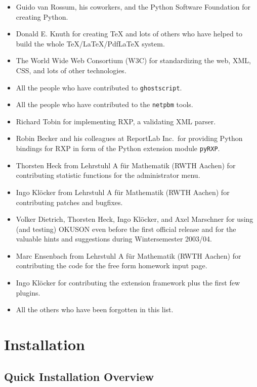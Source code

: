 \documentclass[12pt,openany,a4paper]{book}
\newcommand{\OKUSON}{\textsf{OKUSON}}
\begin{document}
\begin{itemize}
\item Guido van Rossum, his coworkers, and the Python Software Foundation
for creating Python.
\item Donald E. Knuth for creating {\TeX} and lots of others who have 
helped to build the whole {\TeX/\LaTeX/Pdf\LaTeX} system.
\item The World Wide Web Consortium (W3C) for standardizing the web,
XML, CSS, and lots of other technologies.
\item All the people who have contributed to \texttt{ghostscript}.
\item All the people who have contributed to the \texttt{netpbm} tools.
\item Richard Tobin for implementing \textsf{RXP}, a validating XML parser.
\item Robin Becker and his colleagues at ReportLab Inc.~for providing
Python bindings for \textsf{RXP} in form of the Python extension module
\texttt{pyRXP}.
\item Thorsten Heck from Lehrstuhl A für Mathematik (RWTH Aachen) for
contributing statistic functions for the administrator menu.
\item Ingo Klöcker from Lehrstuhl A für Mathematik (RWTH Aachen) for
contributing patches and bugfixes.
\item Volker Dietrich, Thorsten Heck, Ingo Klöcker, and Axel Marschner for
using (and testing) {\OKUSON} even before the first official release and
for the valuable hints and suggestions during Wintersemester 2003/04.
\item Marc Ensenbach from Lehrstuhl A für Mathematik (RWTH Aachen) for 
    contributing the code for the free form homework input page.
\item Ingo Klöcker for contributing the extension framework plus the first
    few plugins.
\item All the others who have been forgotten in this list.
\end{itemize}



\chapter{Installation}\label{ch:inst}

\section{Quick Installation Overview}
\end{document}
